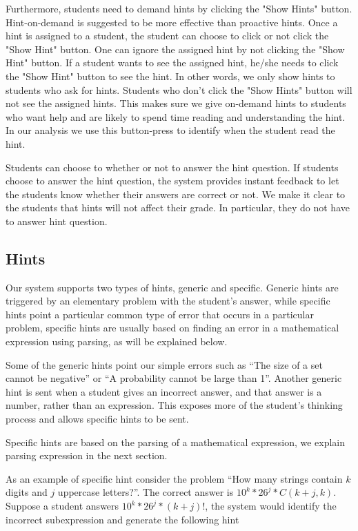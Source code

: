 \documentclass{sigchi/sigchi}
\begin{document}
Furthermore, students need to demand hints by clicking the "Show
Hints" button. Hint-on-demand is suggested to be more effective than
proactive hints\cite{Razzaq2010}. Once a hint is assigned to a
student, the student can choose to click or not click the "Show Hint"
button. One can ignore the assigned hint by not clicking the "Show
Hint" button. If a student wants to see the assigned hint, he/she
needs to click the "Show Hint" button to see the hint. In other words,
we only show hints to students who ask for hints. Students who don't
click the "Show Hints" button will not see the assigned hints. This
makes sure we give on-demand hints to students who want help and are
likely to spend time reading and understanding the hint.  In our
analysis we use this button-press to identify when the student read
the hint.

Students can choose to whether or not to answer the hint question. If
students choose to answer the hint question, the system provides
instant feedback to let the students know whether their answers are
correct or not. We make it clear to the students that hints will not
affect their grade. In particular, they do not have to answer hint
question.

\subsection*{Hints}

Our system supports two types of hints, generic and specific. Generic hints
are triggered by an elementary problem with the student's answer, while specific
hints point a particular common type of error that occurs in a
particular problem, specific hints are usually based on finding an
error in a mathematical expression using parsing, as will be explained below.

Some of the generic hints point our simple errors such as ``The size
of a set cannot be negative'' or ``A probability cannot be large than
1''.   Another generic hint is sent when a student gives an incorrect answer,
and that answer is a number, rather than an expression. This exposes
more of the student's thinking process and allows specific hints to be sent.

Specific hints are based on the parsing of a mathematical expression,
we explain parsing expression in the next section.

As an example of specific hint consider the problem ``How many strings
contain $k$ digits and $j$ uppercase letters?''. The correct answer is
$10^k*26^j*C(k+j,k)$. Suppose a student answers $10^k*26^j*(k+j)!$,
the system would identify the incorrect subexpression and generate the
following hint
\end{document}
